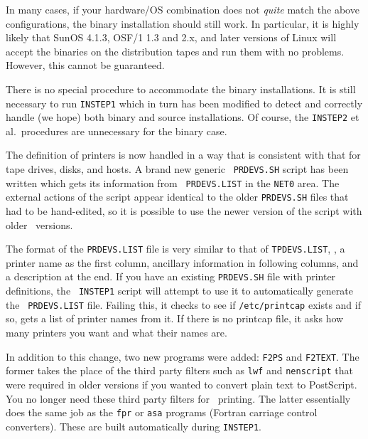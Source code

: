 \noindent In many cases, if your hardware/OS combination does not {\it
quite\/} match the above configurations, the binary installation should
still work.  In particular, it is highly likely that SunOS 4.1.3, OSF/1
1.3 and 2.x, and later versions of Linux will accept the binaries on the
distribution tapes and run them with no problems.  However, this cannot be
guaranteed.

There is no special procedure to accommodate the binary installations.  It
is still necessary to run {\tt INSTEP1} which in turn has been modified to
detect and correctly handle (we hope) both binary and source
installations.  Of course, the {\tt INSTEP2} et al.~procedures are
unnecessary for the binary case.

\medskip{}

The definition of printers is now handled in a way that is consistent with
that for tape drives, disks, and hosts.  A brand new generic {\tt
PRDEVS.SH} script has been written which gets its information from {\tt
PRDEVS.LIST} in the {\tt\dol NET0} area.  The external actions of the
script appear identical to the older {\tt PRDEVS.SH} files that had to be
hand-edited, so it is possible to use the newer version of the script with
older \AIPS\ versions.

The format of the {\tt PRDEVS.LIST} file is very similar to that of
{\tt TPDEVS.LIST}, \ie, a printer name as the first column, ancillary
information in following columns, and a description at the end.  If you
have an existing {\tt PRDEVS.SH} file with printer definitions, the {\tt
INSTEP1} script will attempt to use it to automatically generate the {\tt
PRDEVS.LIST} file.  Failing this, it checks to see if {\tt /etc/printcap}
exists and if so, gets a list of printer names from it.  If there is no
printcap file, it asks how many printers you want and what their names
are.

In addition to this change, two new programs were added: {\tt F2PS} and
{\tt F2TEXT}.  The former takes the place of the third party filters such
as {\tt lwf} and {\tt nenscript} that were required in older versions if
you wanted to convert plain text to PostScript.  You no longer need these
third party filters for \AIPS\ printing.  The latter essentially does the
same job as the {\tt fpr} or {\tt asa} programs (Fortran carriage control
converters).  These are built automatically during {\tt INSTEP1}.

\medskip{}


